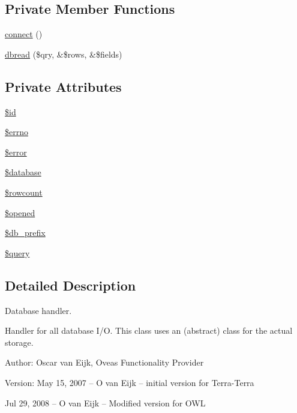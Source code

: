 \subsection*{Private Member Functions}
\begin{CompactItemize}
\item 
\hyperlink{classDbHandler_9cf52ba614981a0082063d57290d3b7c}{connect} ()
\item 
\hyperlink{classDbHandler_130e49aa639fecb46ce6719ddcb0d72f}{dbread} (\$qry, \&\$rows, \&\$fields)
\end{CompactItemize}
\subsection*{Private Attributes}
\begin{CompactItemize}
\item 
\hyperlink{classDbHandler_d38e1c3312815c8ad4093957881092ff}{\$id}
\item 
\hyperlink{classDbHandler_f6e9f493be56617cb533763bb2a0e85a}{\$errno}
\item 
\hyperlink{classDbHandler_de79e11156abbfc180864beb5b9df377}{\$error}
\item 
\hyperlink{classDbHandler_faac5248f9ee59786b48a7b51f318940}{\$database}
\item 
\hyperlink{classDbHandler_56a7ae4bd7d842c85f3fe8052aecbfef}{\$rowcount}
\item 
\hyperlink{classDbHandler_71e36ffbff0d157b1d91dc000bc6f821}{\$opened}
\item 
\hyperlink{classDbHandler_19af96598e7f72673fc5da26ad77731b}{\$db\_\-prefix}
\item 
\hyperlink{classDbHandler_d671b5596b37dac6d48a660a07775965}{\$query}
\end{CompactItemize}


\subsection{Detailed Description}
Database handler. 

Handler for all database I/O. This class uses an (abstract) class for the actual storage. \begin{Desc}
\item[Author:]Oscar van Eijk, Oveas Functionality Provider \end{Desc}
\begin{Desc}
\item[Version:]May 15, 2007 -- O van Eijk -- initial version for Terra-Terra 

Jul 29, 2008 -- O van Eijk -- Modified version for OWL \end{Desc}


